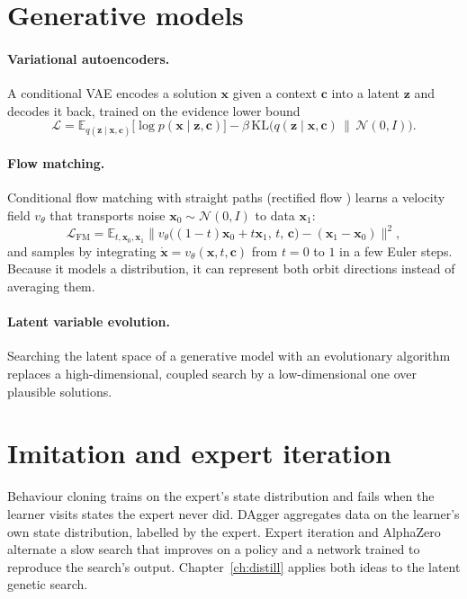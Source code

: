 \documentclass[11pt,a4paper,oneside]{report}
\newcommand{\vect}[1]{\boldsymbol{#1}}
\newcommand{\E}{\mathbb{E}}
\begin{document}
\section{Generative models}
\paragraph{Variational autoencoders.} A conditional VAE \cite{kingma2014} encodes a solution $\vect x$ given a context $\vect c$ into a latent $\vect z$ and decodes it back, trained on the evidence lower bound
\begin{equation}
\mathcal L = \E_{q(\vect z\mid\vect x,\vect c)}\big[\log p(\vect x\mid\vect z,\vect c)\big] - \beta\,\mathrm{KL}\big(q(\vect z\mid\vect x,\vect c)\,\|\,\mathcal N(0,I)\big).
\end{equation}
\paragraph{Flow matching.} Conditional flow matching \cite{lipman2023} with straight paths (rectified flow \cite{liu2023}) learns a velocity field $v_\theta$ that transports noise $\vect x_0\sim\mathcal N(0,I)$ to data $\vect x_1$:
\begin{equation}\label{eq:fm}
\mathcal L_{\mathrm{FM}} = \E_{t,\vect x_0,\vect x_1}\big\| v_\theta\big((1-t)\vect x_0 + t\vect x_1,\, t,\, \vect c\big) - (\vect x_1 - \vect x_0)\big\|^2,
\end{equation}
and samples by integrating $\dot{\vect x} = v_\theta(\vect x, t, \vect c)$ from $t=0$ to $1$ in a few Euler steps. Because it models a distribution, it can represent both orbit directions instead of averaging them.
\paragraph{Latent variable evolution.} Searching the latent space of a generative model with an evolutionary algorithm \cite{volz2018,gaier2020} replaces a high-dimensional, coupled search by a low-dimensional one over plausible solutions.

\section{Imitation and expert iteration}
Behaviour cloning trains on the expert's state distribution and fails when the learner visits states the expert never did. DAgger \cite{ross2011} aggregates data on the learner's own state distribution, labelled by the expert. Expert iteration \cite{anthony2017} and AlphaZero \cite{silver2018} alternate a slow search that improves on a policy and a network trained to reproduce the search's output. Chapter~\ref{ch:distill} applies both ideas to the latent genetic search.
\end{document}
